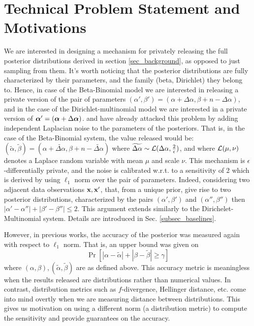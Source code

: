 \documentclass{article}
\begin{document}
\section{Technical Problem Statement and Motivations}
\label{sec_moti}
We are interested in designing a mechanism for privately releasing the full posterior
distributions derived in section \ref{sec_background}, as opposed to just sampling from them.
It's worth noticing that the posterior distributions are fully characterized
by their parameters, and the family (beta, Dirichlet) they belong to. Hence, in case of the
Beta-Binomial model we are interested in releasing a private version of the pair of
parameters $(\alpha',\beta')=(\alpha + \Delta \alpha,\beta + n - \Delta \alpha)$, and
in the case of the Dirichlet-multinomial model we are interested in a private version of
$\boldsymbol{\alpha}'=(\boldsymbol{\alpha} + \Delta \boldsymbol{\alpha})$. \cite{zhang2016differential} and \cite{xiao2012bayesian}
have already attacked this problem by adding independent Laplacian noise to the
parameters of the posteriors. That is, in the case of the Beta-Binomial system,
the value released would  be: $(\tilde\alpha,\tilde\beta)=(\alpha +  \widetilde{\Delta \alpha},\beta + n - \widetilde{\Delta \alpha})$
where $\widetilde{\Delta \alpha}\sim \mathcal{L}(\Delta \alpha, \frac{2}{\epsilon})$,
and where $\mathcal{L}(\mu, \nu)$ denotes a Laplace random variable with mean $\mu$ and scale $\nu$.
This mechanism is $\epsilon$-differentially private, and the noise is
calibrated w.r.t. to a sensitivity of 2 which is derived by using
$\ell_1$ norm over the pair of parameters. Indeed, considering two
adjacent data observations $\textbf{x}, \textbf{x}'$, that, from a unique prior, give rise to two posterior
distributions, characterized by the pairs
$(\alpha',\beta')$ and $(\alpha'',\beta'')$ then
$|\alpha'-\alpha''|+|\beta'-\beta''|\leq 2$.
This argument extends similarly to the Dirichelet-Multinomial system. Details are introduced in Sec. \ref{subsec_baselines}.

However, in previous works, the accuracy of the posterior was measured again with respect to $\ell_1$ norm. That is, an upper bound was given on
\[
  \Pr[|\alpha - \tilde\alpha| + |\beta - \tilde\beta |\geq \gamma ]
\]
where $(\alpha, \beta), (\tilde\alpha,\tilde\beta)$ are as defined above. This accuracy metric is meaningless when the results released are distributions rather than numerical values. In contrast, distribution metrics such as $f$-divergence, Hellinger distance, etc. come into mind overtly when we are measuring distance between distributions. This gives us motivation on using a different norm (a distribution metric) to compute the sensitivity
and provide guarantees on the accuracy. 
\end{document}
